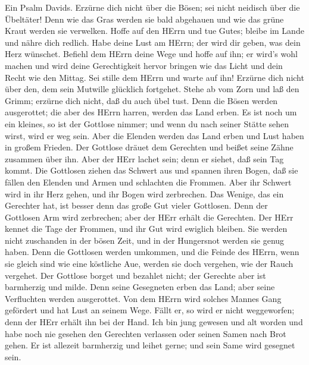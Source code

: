  Ein Psalm Davids. Erzürne dich nicht über die Bösen; sei
nicht neidisch über die Übeltäter!  Denn wie das Gras werden
sie bald abgehauen und wie das grüne Kraut werden sie verwelken.
 Hoffe auf den HErrn und tue Gutes; bleibe im Lande und
nähre dich redlich.  Habe deine Lust am HErrn; der wird dir
geben, was dein Herz wünschet.  Befiehl dem HErrn deine Wege
und hoffe auf ihn; er wird's wohl machen  und wird deine
Gerechtigkeit hervor bringen wie das Licht und dein Recht wie den
Mittag.  Sei stille dem HErrn und warte auf ihn! Erzürne
dich nicht über den, dem sein Mutwille glücklich fortgehet. 
Stehe ab vom Zorn und laß den Grimm; erzürne dich nicht, daß du auch
übel tust.  Denn die Bösen werden ausgerottet; die aber des
HErrn harren, werden das Land erben.  Es ist noch um ein
kleines, so ist der Gottlose nimmer; und wenn du nach seiner Stätte
sehen wirst, wird er weg sein.  Aber die Elenden werden das
Land erben und Lust haben in großem Frieden.  Der Gottlose
dräuet dem Gerechten und beißet seine Zähne zusammen über ihn.
 Aber der HErr lachet sein; denn er siehet, daß sein Tag
kommt.  Die Gottlosen ziehen das Schwert aus und spannen
ihren Bogen, daß sie fällen den Elenden und Armen und schlachten die
Frommen.  Aber ihr Schwert wird in ihr Herz gehen, und ihr
Bogen wird zerbrechen.  Das Wenige, das ein Gerechter hat,
ist besser denn das große Gut vieler Gottlosen.  Denn der
Gottlosen Arm wird zerbrechen; aber der HErr erhält die Gerechten.
 Der HErr kennet die Tage der Frommen, und ihr Gut wird
ewiglich bleiben.  Sie werden nicht zuschanden in der bösen
Zeit, und in der Hungersnot werden sie genug haben.  Denn
die Gottlosen werden umkommen, und die Feinde des HErrn, wenn sie gleich
sind wie eine köstliche Aue, werden sie doch vergehen, wie der Rauch
vergehet.  Der Gottlose borget und bezahlet nicht; der
Gerechte aber ist barmherzig und milde.  Denn seine
Gesegneten erben das Land; aber seine Verfluchten werden ausgerottet.
 Von dem HErrn wird solches Mannes Gang gefördert und hat
Lust an seinem Wege.  Fällt er, so wird er nicht
weggeworfen; denn der HErr erhält ihn bei der Hand.  Ich
bin jung gewesen und alt worden und habe noch nie gesehen den Gerechten
verlassen oder seinen Samen nach Brot gehen.  Er ist
allezeit barmherzig und leihet gerne; und sein Same wird gesegnet sein.
